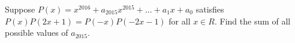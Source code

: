 Suppose $P(x) = x^{2016} + a_{2015}x^{2015} + ...+ a_1x + a_0$ satisfies $P(x)P(2x + 1) = P(-x)P(-2x - 1)$ for all $x \in R$. Find the sum of all possible values of $a_{2015}$.